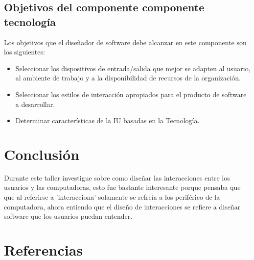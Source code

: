 \documentclass[11pt]{article}
\begin{document}
\subsection{Objetivos del componente componente tecnología}
\label{sec:org65bee05}
\autocite{narciso_valero_2008} Los objetivos que el diseñador de software
debe alcanzar en este componente son los siguientes:

\begin{itemize}
\item Seleccionar los dispositivos de entrada/salida que mejor se adapten al usuario, al ambiente de trabajo y a la disponibilidad de recursos de la organización.
\item Seleccionar los estilos de interacción apropiados para el producto de software a desarrollar.
\item Determinar características de la IU basadas en la Tecnología.
\end{itemize}


\section{Conclusión}
\label{sec:org7d0bb94}
Durante este taller investigue sobre como diseñar las interacciones entre los 
usuarios y las computadoras, esto fue bastante interesante porque pensaba que 
que al referirse a 'interacciona' solamente se refreía a los periférico de la 
computadora, ahora entiendo que el diseño de interacciones se refiere a diseñar 
software que los usuarios puedan entender.  

\section{Referencias}
\label{sec:orgd95483e}
\printbibliography[heading=none]
\end{document}

